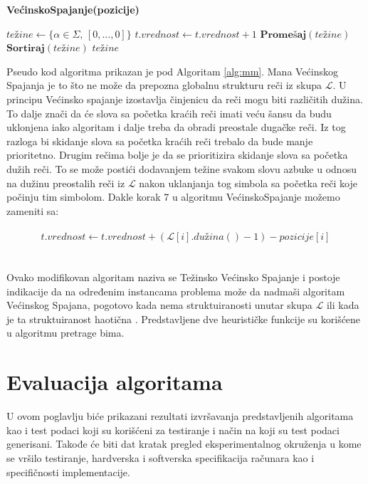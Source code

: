 \documentclass[12pt,oneside]{memoir}
\begin{document}
\begin{algorithm}
  \caption{\textbf{VećinskoSpajanje(pozicije)}}
  \label{alg:mm}
  \begin{algorithmic}[1]
  \State $te\textrm{ž}ine \gets \{\alpha \in \Sigma\textrm{, }[0,...,0] \}$ 
  \State
          \State $t.vrednost \gets t.vrednost + 1$
        \EndIf 
      \EndFor
    \EndIf 
  \EndFor
  \State
  \State $\textbf{Promešaj}(te\textrm{ž}ine)$
  \State $\textbf{Sortiraj}(te\textrm{ž}ine)$
  \State
  \State \Return $te\textrm{ž}ine$
  \end{algorithmic}
  \end{algorithm}

Pseudo kod algoritma prikazan je pod Algoritam \ref{alg:mm}.
Mana Većinskog Spajanja je to što ne može da prepozna globalnu strukturu reči iz skupa $\mathcal{L}$.
U principu Većinsko spajanje izostavlja činjenicu da reči mogu biti različitih dužina. To dalje 
znači da će slova sa početka kraćih reči imati veću šansu da budu uklonjena iako algoritam i dalje treba
da obradi preostale dugačke reči. Iz tog razloga bi skidanje slova sa početka kraćih reči trebalo da bude
manje prioritetno. Drugim rečima bolje je da se prioritizira skidanje slova sa početka dužih reči.
To se može postići dodavanjem težine svakom slovu azbuke u odnosu na dužinu preostalih reči iz $\mathcal{L}$ 
nakon uklanjanja tog simbola sa početka reči koje počinju tim simbolom. Dakle korak 7 u algoritmu VećinskoSpajanje
možemo zameniti sa:
\\
\\
\begin{equation}
  \label{eqn:wmm}
  t.vrednost \gets t.vrednost + (\mathcal{L}[i].du\textrm{ž}ina() - 1) - pozicije[i]
\end{equation}
\\
\\
Ovako modifikovan algoritam naziva se Težinsko Većinsko Spajanje i postoje indikacije da na određenim instancama
problema može da nadmaši algoritam Većinskog Spajana, pogotovo kada nema struktuiranosti unutar skupa $\mathcal{L}$
ili kada je ta struktuiranost haotična \cite{ProbabilisticBS}. Predstavljene dve heurističke
funkcije su korišćene u algoritmu pretrage bima.

\chapter{Evaluacija algoritama}
\label{chap:evaluacijaAlg}
U ovom poglavlju biće prikazani rezultati izvršavanja predstavljenih algoritama
kao i test podaci koji su korišćeni za testiranje i način na koji su test podaci generisani.
Takođe će biti dat kratak pregled eksperimentalnog okruženja u kome se vršilo testiranje,
hardverska i softverska specifikacija računara kao i specifičnosti implementacije.
\end{document}
